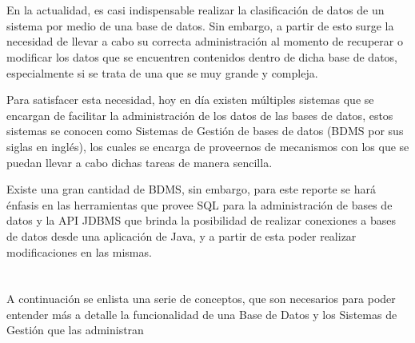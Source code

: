 \documentclass[10pt,a4paper]{article} %
\begin{document}
	\pagebreak
	
	\section{}%
	{\large En la actualidad, es casi indispensable realizar la clasificaci{\' o}n de datos de un sistema por medio de una base de datos. Sin embargo, a partir de esto surge la necesidad de llevar a cabo su correcta administraci{\' o}n al momento de recuperar o modificar los datos que se encuentren contenidos dentro de dicha base de datos, especialmente si se trata de una que se muy grande y compleja. 
		
		
		\vspace{0.5cm}
		Para satisfacer esta necesidad, hoy en d{\' i}a existen m{\' u}ltiples sistemas que se encargan de facilitar la administraci{\' o}n de los datos de las bases de datos, estos sistemas se conocen como Sistemas de Gesti{\' o}n de bases de datos (BDMS por sus siglas en ingl{\' e}s), los cuales se encarga de proveernos de mecanismos con los que se puedan llevar a cabo dichas tareas de manera sencilla.
		
		
		\vspace{0.5cm}
		Existe una gran cantidad de BDMS, sin embargo, para este reporte se har{\' a} {\' e}nfasis en las herramientas que provee SQL para la administraci{\' o}n de bases de datos y la API JDBMS que brinda la posibilidad de realizar conexiones a bases de datos desde una aplicaci{\' o}n de Java, y a partir de esta poder realizar modificaciones en las mismas.}
	
	
	\pagebreak
	
	\section{\color{colorIPN}{Conceptos}}
	{\large A continuaci{\' o}n se enlista una serie de conceptos, que son necesarios para poder entender m{\' a}s a detalle la funcionalidad de una Base de Datos y los Sistemas de Gesti{\' o}n que las administran}
	
\end{document}
